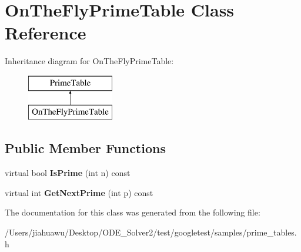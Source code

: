 \hypertarget{class_on_the_fly_prime_table}{}\section{On\+The\+Fly\+Prime\+Table Class Reference}
\label{class_on_the_fly_prime_table}
Inheritance diagram for On\+The\+Fly\+Prime\+Table\+:\begin{figure}[H]
\begin{center}
\leavevmode
\includegraphics[height=2.000000cm]{class_on_the_fly_prime_table}
\end{center}
\end{figure}
\subsection*{Public Member Functions}
\begin{DoxyCompactItemize}
\item 
\mbox{\label{class_on_the_fly_prime_table_a1d49b78f79e018441289e79d75680067}} 
virtual bool {\bfseries Is\+Prime} (int n) const
\item 
\mbox{\label{class_on_the_fly_prime_table_a5a4644fedd95d33136723f33b9302bfc}} 
virtual int {\bfseries Get\+Next\+Prime} (int p) const
\end{DoxyCompactItemize}


The documentation for this class was generated from the following file\+:\begin{DoxyCompactItemize}
\item 
/\+Users/jiahuawu/\+Desktop/\+O\+D\+E\+\_\+\+Solver2/test/googletest/samples/prime\+\_\+tables.\+h\end{DoxyCompactItemize}
